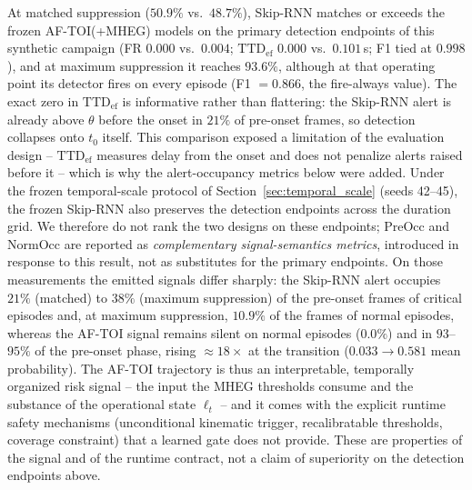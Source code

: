 \documentclass[a4paper,fleqn]{cas-dc}
\newcommand{\MHEG}{\mbox{MHEG}\xspace}
\begin{document}
{At matched suppression ($50.9\%$ vs.\ $48.7\%$), Skip-RNN matches or exceeds
the frozen \mbox{AF-TOI}(+\MHEG) models on the primary detection endpoints of
this synthetic campaign (FR $0.000$ vs.\ $0.004$; $\mathrm{TTD}_{\mathrm{ef}}$
$0.000$ vs.\ $0.101$\,s; F1 tied at $0.998$), and at maximum suppression it
reaches $93.6\%$, although at that operating point its detector fires on
every episode (F1 $=0.866$, the fire-always value). The exact zero in
$\mathrm{TTD}_{\mathrm{ef}}$ is informative rather than flattering: the
Skip-RNN alert is already above $\theta$ before the onset in $21\%$ of
pre-onset frames, so detection collapses onto $t_0$ itself. This comparison
exposed a limitation of the evaluation design -- $\mathrm{TTD}_{\mathrm{ef}}$
measures delay from the onset and does not penalize alerts raised before it
-- which is why the alert-occupancy metrics below were added. Under the
frozen temporal-scale protocol of Section~\ref{sec:temporal_scale} (seeds
42--45), the frozen Skip-RNN also preserves the detection endpoints across
the duration grid. We therefore do not rank the two designs on these
endpoints; PreOcc and NormOcc are reported as \emph{complementary
signal-semantics metrics}, introduced in response to this result, not as
substitutes for the primary endpoints. On those measurements the emitted
signals differ sharply: the Skip-RNN alert occupies $21\%$ (matched) to
$38\%$ (maximum suppression) of the pre-onset frames of critical episodes
and, at maximum suppression, $10.9\%$ of the frames of normal episodes,
whereas the \mbox{AF-TOI} signal remains silent on normal episodes ($0.0\%$)
and in $93$--$95\%$ of the pre-onset phase, rising ${\approx}18\times$ at the
transition ($0.033 \rightarrow 0.581$ mean probability). The \mbox{AF-TOI}
trajectory is thus an interpretable, temporally organized risk signal -- the
input the \MHEG thresholds consume and the substance of the operational state
$\ell_t$ -- and it comes with the explicit runtime safety mechanisms
(unconditional kinematic trigger, recalibratable thresholds, coverage
constraint) that a learned gate does not provide. These are properties of the
signal and of the runtime contract, not a claim of superiority on the
detection endpoints above.

}
\end{document}
